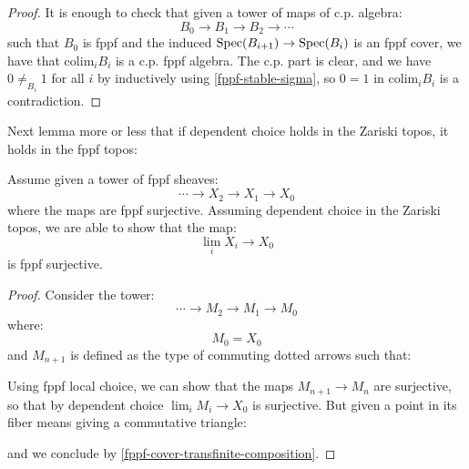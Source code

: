\begin{proof}
It is enough to check that given a tower of maps of c.p. algebra:
\[B_0\to B_1 \to B_2\to\cdots \]
such that $B_0$ is fppf and the induced $\operatorname{Spec}(B_{i+1}) \to \operatorname{Spec}(B_i)$ is an fppf cover, we have that $\mathrm{colim}_iB_i$ is a c.p. fppf algebra. The c.p. part is clear, and we have $0\not=_{B_i}1$ for all $i$ by inductively using \cref{fppf-stable-sigma}, so $0=1$ in $\mathrm{colim}_iB_i$ is a contradiction.
\end{proof}

Next lemma more or less that if dependent choice holds in the Zariski topos, it holds in the fppf topos:

\begin{lemma}
Assume given a tower of fppf sheaves:
\[\cdots \to X_2\to X_1 \to X_0 \]
where the maps are fppf surjective. Assuming dependent choice in the Zariski topos, we are able to show that the map:
\[\lim_i X_i\to X_0\]
is fppf surjective.
\end{lemma}

\begin{proof}
Consider the tower:
\[\cdots \to M_2\to M_1 \to M_0\]
where:
\[M_0 = X_0\]
and $M_{n+1}$ is defined as the type of commuting dotted arrows such that:
 \begin{center}
  \end{center}
  Using fppf local choice, we can show that the maps $M_{n+1}\to M_n$ are surjective, so that by dependent choice $\lim_i M_i \to X_0$ is surjective. But given a point in its fiber means giving a commutative triangle:
 \begin{center}
  \end{center}
  and we conclude by \cref{fppf-cover-transfinite-composition}.
\end{proof}



